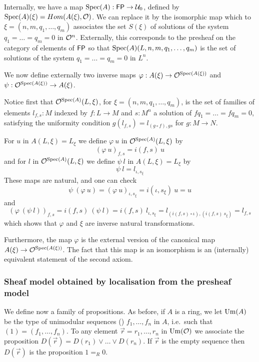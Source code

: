 Internally, we have a map $\operatorname{Spec}(A):\mathsf{FP}\rightarrow \mathcal{U}_0$, defined by $\operatorname{Spec}(A)(\xi) = Hom(A(\xi),\mathcal O)$.
We can replace it by the isomorphic map which to $\xi = (n,m,q_1,\dots,q_m)$ associates the set
$S(\xi)$ of solutions of the system $q_1=\dots=q_m= 0$ in $\mathcal O^n$.
Externally, this corresponds to the presheaf on the category of elements of $\mathsf{FP}$ so that
$\operatorname{Spec}(A)(L,n,m,q_1,\dots,q_m)$ is the set of solutions of the system $q_1=\dots=q_m=0$ in $L^n$.

\medskip

We now define externally two inverse maps $\varphi:A(\xi)\rightarrow \mathcal O^{\operatorname{Spec}(A(\xi))}$ and
$\psi:\mathcal O^{\operatorname{Spec}(A(\xi))}\rightarrow A(\xi)$.

\medskip

Notice first that $\mathcal O^{\operatorname{Spec}(A)}(L,\xi)$, for $\xi = (n,m,q_1,\dots,q_m)$,
is the set of families of elements $l_{f,s}:M$ indexed by $f:L\rightarrow M$
and $s:M^n$ a solution of $fq_1 = \dots = fq_m=0$, satisfying the uniformity condition
$g(l_{f,s}) = l_{(g\circ f),gs}$ for $g:M\rightarrow N$.

\medskip

For $u$ in $A(L,\xi) = L_{\xi}$ we define $\varphi~u$ in $\mathcal O^{\operatorname{Spec}(A)}(L,\xi)$ by
$$
(\varphi~u)_{f,s} = i(f,s)~u
$$
and for $l$ in $\mathcal O^{\operatorname{Spec}(A)}(L,\xi)$ we define $\psi~l$ in $A(L,\xi) = L_{\xi}$ by
$$
\psi~ l = l_{\iota,s_{\xi}}
$$
These maps are natural, and one can check
$$
\psi~(\varphi~u) = (\varphi~u)_{\iota,s_{\xi}} = i(\iota,s_{\xi})~u = u
$$
and
$$
(\varphi~(\psi~l))_{f,s} = i(f,s)~(\psi~l) = i(f,s)~l_{\iota,s_{\xi}} = l_{(i(f,s)\circ \iota),(i(f,s)~s_{\xi})} = l_{f,s}
$$
which shows that $\varphi$ and $\xi$ are inverse natural transformations.

Furthermore, the map $\varphi$ is the external version of the canonical map $A(\xi)\rightarrow \mathcal O^{\operatorname{Spec}(A(\xi))}$.
The fact that this map is an isomorphism is an (internally) equivalent statement of the second axiom.



\subsubsection{Sheaf model obtained by localisation from the presheaf model}

We define now a family of propositions. As before, if $A$ is a ring, we let $\mathrm{Um}(A)$ be the type of unimodular sequences
()
$f_1,\dots,f_n$ in $A$, i.e.\ such that $(1) = (f_1,\dots,f_n)$. To any element $\vec{r} = r_1,\dots,r_n$
in $\mathrm{Um}(\mathcal O)$ we associate
the proposition $D(\vec{r}) = D(r_1)\vee\dots\vee D(r_n)$. If $\vec{r}$ is the empty sequence then
$D(\vec{r})$ is the proposition $1 =_R 0$. %


